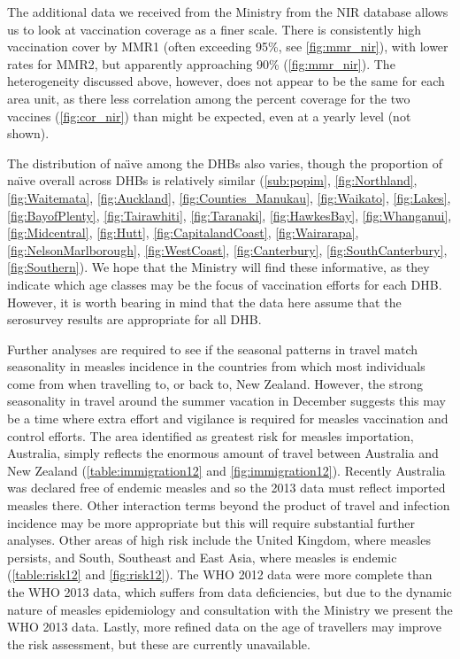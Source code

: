 \documentclass{article}
\begin{document}
The additional data we received from the Ministry from the NIR database allows us to look at vaccination coverage as a finer scale. There is consistently high vaccination cover by MMR1 (often exceeding 95\%, see \autoref{fig:mmr_nir}), with lower rates for MMR2, but apparently approaching 90\% (\autoref{fig:mmr_nir}). The heterogeneity discussed above, however, does not appear to be the same for each area unit, as there less correlation among the percent coverage for the two vaccines (\autoref{fig:cor_nir}) than might be expected, even at a yearly level (not shown).

The distribution of na\"{\i}ve among the DHBs also varies, though the proportion of na\"{\i}ve overall across DHBs is relatively similar (\autoref{sub:popim}, \autoref{fig:Northland}, \autoref{fig:Waitemata}, \autoref{fig:Auckland}, \autoref{fig:Counties_Manukau}, \autoref{fig:Waikato}, \autoref{fig:Lakes}, \autoref{fig:BayofPlenty}, \autoref{fig:Tairawhiti}, \autoref{fig:Taranaki}, \autoref{fig:HawkesBay}, \autoref{fig:Whanganui}, \autoref{fig:Midcentral}, \autoref{fig:Hutt}, \autoref{fig:CapitalandCoast}, \autoref{fig:Wairarapa}, \autoref{fig:NelsonMarlborough}, \autoref{fig:WestCoast}, \autoref{fig:Canterbury}, \autoref{fig:SouthCanterbury}, \autoref{fig:Southern}).  We hope that the Ministry will find these informative, as they indicate which age classes may be the focus of vaccination efforts for each DHB. However, it is worth bearing in mind that the data here assume that the serosurvey results are appropriate for all DHB.

Further analyses are required to see if the seasonal patterns in travel match seasonality in measles incidence in the countries from which most individuals come from when travelling to, or back to, New Zealand. However, the strong seasonality in travel around the summer vacation in December suggests this may be a time where extra effort and vigilance is required for measles vaccination and control efforts. The area identified as greatest risk for measles importation, Australia, simply reflects the enormous amount of travel between Australia and New Zealand (\autoref{table:immigration12} and \autoref{fig:immigration12}). Recently Australia was declared free of endemic measles and so the 2013 data must reflect imported measles there. Other interaction terms beyond the product of travel and infection incidence may be more appropriate but this will require substantial further analyses. Other areas of high risk include the United Kingdom, where measles persists, and South, Southeast and East Asia, where measles is endemic (\autoref{table:risk12} and \autoref{fig:risk12}). The WHO 2012 data were more complete than the WHO 2013 data, which suffers from data deficiencies, but due to the dynamic nature of measles epidemiology and consultation with the Ministry we present the WHO 2013 data. Lastly, more refined data on the age of travellers may improve the risk assessment, but these are currently unavailable.
\end{document}
